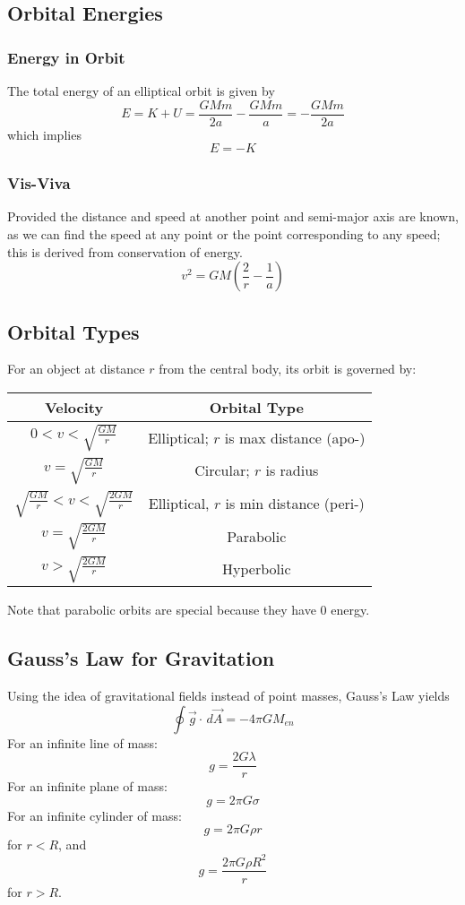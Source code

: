 \documentclass[../PhysicsFormulae.tex]{subfiles}
\begin{document}
\subsection{Orbital Energies}
\subsubsection{Energy in Orbit}
The total energy of an elliptical orbit is given by
\[ E = K + U = \frac{GMm}{2a} - \frac{GMm}{a} = -\frac{GMm}{2a} \]
which implies 
\[ E = -K \]

\subsubsection{Vis-Viva}
Provided the distance and speed at another point and semi-major axis are known, as we can find the speed at any point or the point corresponding to any speed; this is derived from conservation of energy. 
\[ v^2 = GM \left( \frac{2}{r} - \frac{1}{a} \right) \]

\subsection{Orbital Types}
For an object at distance $r$ from the central body, its orbit is governed by: 
\begin{center}
\renewcommand{\arraystretch}{1.8}
\begin{tabular}{|c|c|}
\hline
Velocity & Orbital Type \\ [0.5ex]
\hline
$0<v<\sqrt{\frac{GM}{r}}$ & Elliptical; $r$ is max distance (apo-) \\
\hline
$v=\sqrt{\frac{GM}{r}}$ & Circular; $r$ is radius \\
\hline
$\sqrt{\frac{GM}{r}}<v<\sqrt{\frac{2GM}{r}}$ & Elliptical, $r$ is min distance (peri-) \\
\hline
$v=\sqrt{\frac{2GM}{r}}$ & Parabolic \\
\hline 
$v>\sqrt{\frac{2GM}{r}}$ & Hyperbolic \\
\hline
\end{tabular}
\end{center}
Note that parabolic orbits are special because they have 0 energy. 

\subsection{Gauss's Law for Gravitation}
Using the idea of gravitational fields instead of point masses, Gauss's Law yields
\[ \oint \vec{g} \cdot \,d\vec{A} = -4\pi GM_{en} \]
For an infinite line of mass: 
\[ g = \frac{2G\lambda}{r} \]
For an infinite plane of mass: 
\[ g = 2\pi G \sigma \]
For an infinite cylinder of mass: 
\[ g = 2\pi G \rho r \]
for $r<R$, and 
\[ g = \frac{2\pi G \rho R^2}{r} \]
for $r>R$. 
\end{document}
